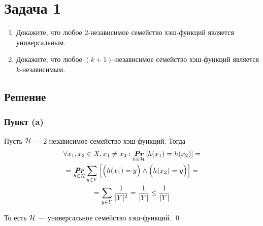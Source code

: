 \section{Задача 1}
\begin{enumerate}[label=(\alph*)]
\item Докажите, что любое 2-независимое семейство хэш-функций является универсальным.
\item Докажите, что любое $(k+1)$-независимое семейство хэш-функций является $k$-независимым.
\end{enumerate}

\subsection{Решение}
\subsubsection{Пункт (a)}
Пусть $\mathcal{H}$ --- 2-независимое семейство хэш-функций. Тогда
\begin{gather*}
    \forall x_1, x_2 \in X, x_1 \neq x_2 : \underset{h \in \mathcal{H}}{\textit{\textbf{Pr}}} \left[ h(x_1) = h(x_2) \right] = \\
    = \underset{h \in \mathcal{H}}{\textit{\textbf{Pr}}} \sum_{y \in Y} \left[ \Bigl( h(x_1) = y \Bigr) \land \Bigl( h(x_2) = y \Bigr) \right] = \\
    = \sum_{y \in Y} \frac{1}{|Y|^2} = \frac{1}{|Y|} \leq \frac{1}{|Y|}
\end{gather*}

То есть $\mathcal{H}$ --- универсальное семейство хэш-функций.
\qed

